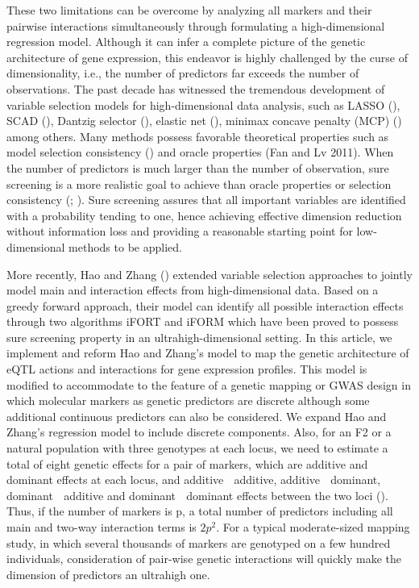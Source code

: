 \documentclass[11pt,]{book}
\theoremstyle{definition}
\theoremstyle{definition}
\theoremstyle{remark}
\begin{document}
These two limitations can be overcome by analyzing all markers and their
pairwise interactions simultaneously through formulating a
high-dimensional regression model. Although it can infer a complete
picture of the genetic architecture of gene expression, this endeavor is
highly challenged by the curse of dimensionality, i.e., the number of
predictors far exceeds the number of observations. The past decade has
witnessed the tremendous development of variable selection models for
high-dimensional data analysis, such as LASSO
(\cite{tibshirani1996regression}), SCAD (\cite{fan2001variable}),
Dantzig selector (\cite{candes2007dantzig}), elastic net
(\cite{zhao2006model}), minimax concave penalty (MCP)
(\cite{zhang2010nearly}) among others. Many methods possess favorable
theoretical properties such as model selection consistency
(\cite{zhao2006model}) and oracle properties (Fan and Lv 2011). When the
number of predictors is much larger than the number of observation, sure
screening is a more realistic goal to achieve than oracle properties or
selection consistency (\cite{fan2008sure}; \cite{wang2009forward}). Sure
screening assures that all important variables are identified with a
probability tending to one, hence achieving effective dimension
reduction without information loss and providing a reasonable starting
point for low-dimensional methods to be applied.

More recently, Hao and Zhang (\cite{hao2014interaction}) extended
variable selection approaches to jointly model main and interaction
effects from high-dimensional data. Based on a greedy forward approach,
their model can identify all possible interaction effects through two
algorithms iFORT and iFORM which have been proved to possess sure
screening property in an ultrahigh-dimensional setting. In this article,
we implement and reform Hao and Zhang's model to map the genetic
architecture of eQTL actions and interactions for gene expression
profiles. This model is modified to accommodate to the feature of a
genetic mapping or GWAS design in which molecular markers as genetic
predictors are discrete although some additional continuous predictors
can also be considered. We expand Hao and Zhang's regression model to
include discrete components. Also, for an F2 or a natural population
with three genotypes at each locus, we need to estimate a total of eight
genetic effects for a pair of markers, which are additive and dominant
effects at each locus, and additive  additive, additive  dominant,
dominant  additive and dominant  dominant effects between the two loci
(\cite{kempthorne1968correlation}). Thus, if the number of markers is p,
a total number of predictors including all main and two-way interaction
terms is \(2p^2\). For a typical moderate-sized mapping study, in which
several thousands of markers are genotyped on a few hundred individuals,
consideration of pair-wise genetic interactions will quickly make the
dimension of predictors an ultrahigh one.
\end{document}
